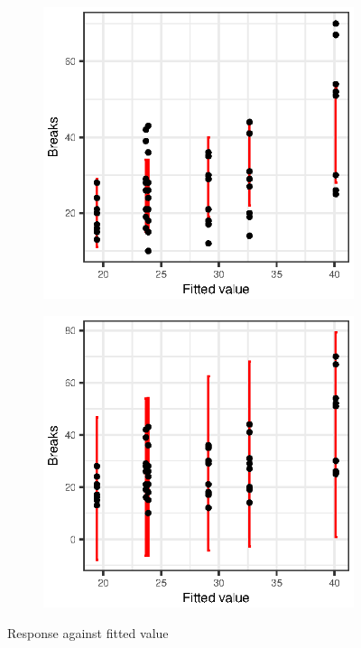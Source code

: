 \documentclass[titlepage]{article}
\begin{document}
\begin{figure}[!htb]
  \centering
  \begin{subfigure}{0.45\linewidth}
    \includegraphics{q4-resp-fit-pois}
    \centering
    \label{fig:q4-resp-fit-pois}
  \end{subfigure}
  \begin{subfigure}{0.45\linewidth}
    \centering
    \includegraphics{q4-resp-fit-quasi}
    \label{fig:q4-resp-fit-quasi}
  \end{subfigure}
  \caption{Response against fitted value}
\end{figure}
\end{document}
